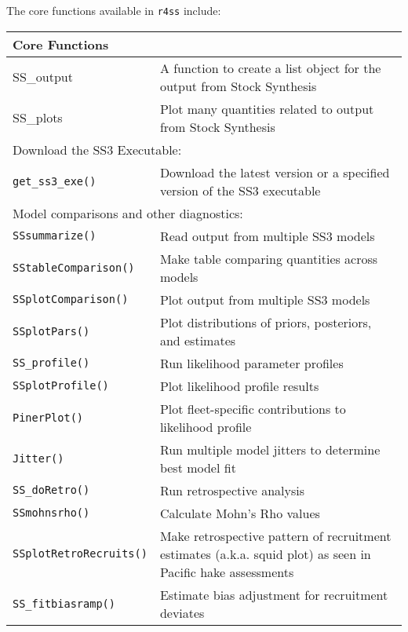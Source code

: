 The core functions available in \texttt{r4ss} include:
\begin{center}
	\begin{longtable}{p{4.5cm} p{10.52cm}}
		\hline
		Core Functions & \Tstrut\Bstrut\\
		\hline
		SS\_output \Tstrut & A function to create a list object for the output from Stock Synthesis \\
		SS\_plots  \Tstrut & Plot many quantities related to output from Stock Synthesis \\
		\hline
		
		\multicolumn{2}{l}{Download the SS3 Executable:} \Tstrut\Bstrut\\
		\hline
		\texttt{get\_ss3\_exe()} \Tstrut & Download the latest version or a specified version of the SS3 executable \\
		\hline
	
		\multicolumn{2}{l}{Model comparisons and other diagnostics:} \Tstrut\Bstrut\\
		\hline
		\texttt{SSsummarize()} \Tstrut & Read output from multiple SS3 models \\
		\texttt{SStableComparison()} \Tstrut & Make table comparing quantities across models \\
		\texttt{SSplotComparison()} \Tstrut & Plot output from multiple SS3 models \\
		\texttt{SSplotPars()} \Tstrut & Plot distributions of priors, posteriors, and estimates \\
		\texttt{SS\_profile()} \Tstrut & Run likelihood parameter profiles \\
		\texttt{SSplotProfile()} \Tstrut & Plot likelihood profile results \\
		\texttt{PinerPlot()} \Tstrut & Plot fleet-specific contributions to likelihood profile \\
		\texttt{Jitter()} \Tstrut & Run multiple model jitters to determine best model fit \\
		\texttt{SS\_doRetro()} \Tstrut & Run retrospective analysis \\
		\texttt{SSmohnsrho()} \Tstrut & Calculate Mohn's Rho values \\
		\texttt{SSplotRetroRecruits()} \Tstrut & Make retrospective pattern of recruitment estimates (a.k.a. squid plot) as seen in Pacific hake assessments\Bstrut \\
		\texttt{SS\_fitbiasramp()} \Tstrut & Estimate bias adjustment for recruitment deviates \Bstrut\\
		\hline
		

\end{longtable}
\end{center}
